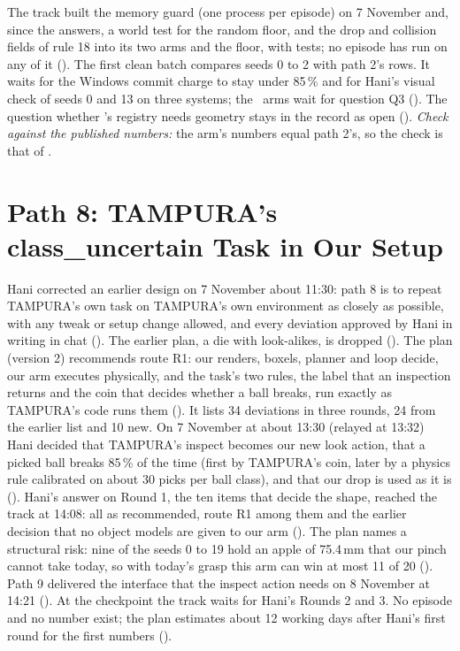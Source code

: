 The track built the memory guard (one process per episode) on 7 November and, since the answers, a world
test for the random floor, and the drop and collision fields of rule 18 into its two
arms and the floor, with tests; no episode has run on any of it (). The first
clean batch compares seeds 0 to 2 with path 2's rows. It waits for the Windows commit
charge to stay under 85\,\% and for Hani's visual check of seeds 0 and 13 on three
systems; the \slamcol\ arms wait for question Q3 (). The question whether
\cuncert's registry needs geometry stays in the record as open ().
\emph{Check against the published numbers:} the arm's numbers equal path 2's, so the
check is that of .

\section{Path 8: TAMPURA's class\_uncertain Task in Our Setup}
\label{sec:path8}

Hani corrected an earlier design on 7 November about 11:30: path 8 is to repeat
TAMPURA's own task on TAMPURA's own environment as closely as possible, with any
tweak or setup change allowed, and every deviation approved by Hani in writing in chat
(). The earlier plan, a die with look-alikes, is dropped (). The plan
(version 2) recommends route R1: our renders, boxels, planner and loop decide, our
arm executes physically, and the task's two rules, the label that an inspection
returns and the coin that decides whether a ball breaks, run exactly as TAMPURA's
code runs them (). It lists 34 deviations in three rounds, 24 from the earlier
list and 10 new. On 7 November at about 13:30 (relayed at 13:32) Hani decided that TAMPURA's inspect becomes
our new look action, that a picked ball breaks 85\,\% of the time (first by TAMPURA's
coin, later by a physics rule calibrated on about 30 picks per ball class), and that
our drop is used as it is (). Hani's answer on Round 1, the ten items that decide
the shape, reached the track at 14:08: all as recommended, route R1 among them and the
earlier decision that no object models are given to our arm (). The plan names a
structural risk: nine of the seeds 0 to 19 hold an apple of 75.4\,mm that our pinch
cannot take today, so with today's grasp this arm can win at most 11 of 20 ().
Path 9 delivered the interface that the inspect action needs on 8 November at 14:21
(). At the checkpoint the track waits for Hani's Rounds 2 and 3. No episode and
no number exist; the plan estimates about 12 working days after Hani's first round for
the first numbers ().

